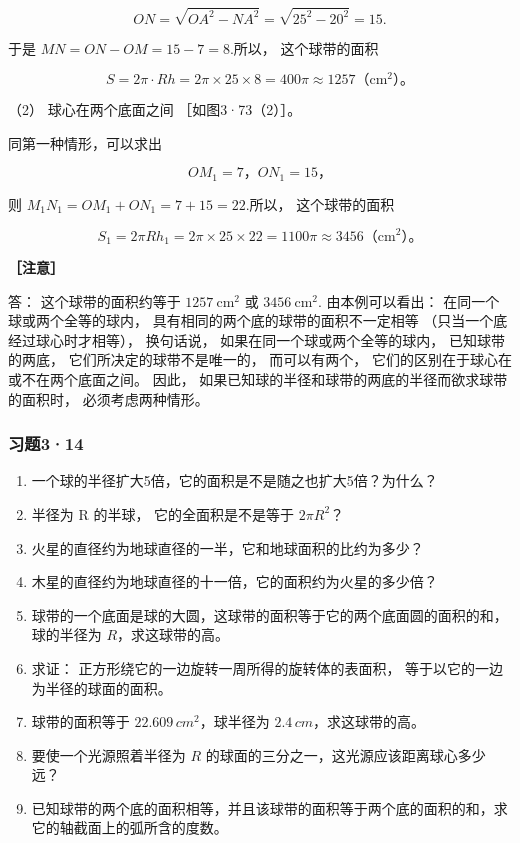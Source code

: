 \[
O N = \sqrt {O A ^ {2} - N A ^ {2}} = \sqrt {25^{2} - 20^{2}} = 15.
\]

于是 \(MN = ON - OM = 15 - 7 = 8.\)所以， 这个球带的面积

\[
S = 2 \pi \cdot R h = 2 \pi \times 25 \times 8 = 400 \pi \approx 1257 \text{（}\mathrm{cm} ^ {2}\text{）。}
\]

（2） 球心在两个底面之间 ［如图3·73（2）］。

同第一种情形，可以求出

\[
O M _ {1} = 7\text{，} O N _ {1} = 15\text{，}
\]

则 \(M_{1}N_{1} = OM_{1} + ON_{1} = 7 + 15 = 22.\)所以， 这个球带的面积

\[
S _ {1} = 2 \pi R h _ {1} = 2 \pi \times 25 \times 22 = 1100 \pi \approx 3456 \text{（}\mathrm{cm} ^ {2}\text{）。}
\]

\textbf{［注意］}

答： 这个球带的面积约等于 \(1257 \mathrm{~cm}^{2}\) 或
\(3456 \mathrm{~cm}^{2}\). 由本例可以看出： 在同一个球或两个全等的球内，
具有相同的两个底的球带的面积不一定相等 （只当一个底经过球心时才相等），
换句话说， 如果在同一个球或两个全等的球内， 已知球带的两底，
它们所决定的球带不是唯一的， 而可以有两个，
它们的区别在于球心在或不在两个底面之间。 因此，
如果已知球的半径和球带的两底的半径而欲求球带的面积时，
必须考虑两种情形。

\subsubsection{习题3·14}

\begin{enumerate}
\item
  一个球的半径扩大5倍，它的面积是不是随之也扩大5倍？为什么？
\item
  半径为 R 的半球， 它的全面积是不是等于 \(2\pi R^{2}\)？
\item
  火星的直径约为地球直径的一半，它和地球面积的比约为多少？
\item
  木星的直径约为地球直径的十一倍，它的面积约为火星的多少倍？
\item
  球带的一个底面是球的大圆，这球带的面积等于它的两个底面圆的面积的和，球的半径为
  \(R\)，求这球带的高。
\item
  求证： 正方形绕它的一边旋转一周所得的旋转体的表面积，
  等于以它的一边为半径的球面的面积。
\item
  球带的面积等于 \(22.609 \, cm^{2}\)，球半径为
  \(2.4 \, cm\)，求这球带的高。
\item
  要使一个光源照着半径为 \(R\)
  的球面的三分之一，这光源应该距离球心多少远？
\item
  已知球带的两个底的面积相等，并且该球带的面积等于两个底的面积的和，求它的轴截面上的弧所含的度数。
\end{enumerate}

